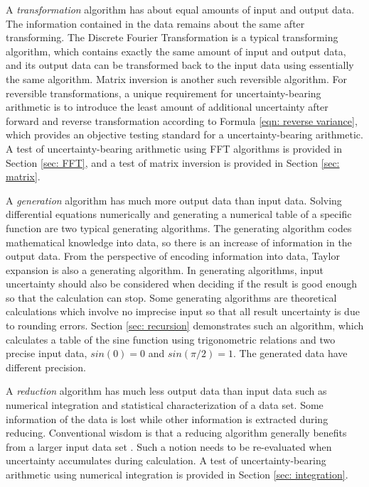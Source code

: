 \documentclass[twoside]{article}
\numberwithin{equation}{section}
\begin{document}
A \emph{transformation} algorithm has about equal amounts of input and output data.  
The information contained in the data remains about the same after transforming.  
The Discrete Fourier Transformation is a typical transforming algorithm, which contains exactly the same amount of input and output data, and its output data can be transformed back to the input data using essentially the same algorithm.  
Matrix inversion is another such reversible algorithm.  
For reversible transformations, a unique requirement for uncertainty-bearing arithmetic is to introduce the least amount of additional uncertainty after forward and reverse transformation according to Formula \eqref{eqn: reverse variance}, which provides an objective testing standard for a uncertainty-bearing arithmetic.  
A test of uncertainty-bearing arithmetic using FFT algorithms is provided in Section \ref{sec: FFT}, and a test of matrix inversion is provided in Section \ref{sec: matrix}.

A \emph{generation} algorithm has much more output data than input data.  
Solving differential equations numerically and generating a numerical table of a specific function are two typical generating algorithms.  
The generating algorithm codes mathematical knowledge into data, so there is an increase of information in the output data.  
From the perspective of encoding information into data, Taylor expansion is also a generating algorithm. 
In generating algorithms, input uncertainty should also be considered when deciding if the result is good enough so that the calculation can stop.  
Some generating algorithms are theoretical calculations which involve no imprecise input so that all result uncertainty is due to rounding errors.  
Section \ref{sec: recursion} demonstrates such an algorithm, which calculates a table of the sine function using trigonometric relations and two precise input data, $sin(0)=0$ and $sin(\pi/2)=1$.  
The generated data have different precision.

A \emph{reduction} algorithm has much less output data than input data such as numerical integration and statistical characterization of a data set.  
Some information of the data is lost while other information is extracted during reducing.  
Conventional wisdom is that a reducing algorithm generally benefits from a larger input data set \cite{Probability_Statistics}.  
Such a notion needs to be re-evaluated when uncertainty accumulates during calculation.  
A test of uncertainty-bearing arithmetic using numerical integration is provided in Section \ref{sec: integration}.
\end{document}
